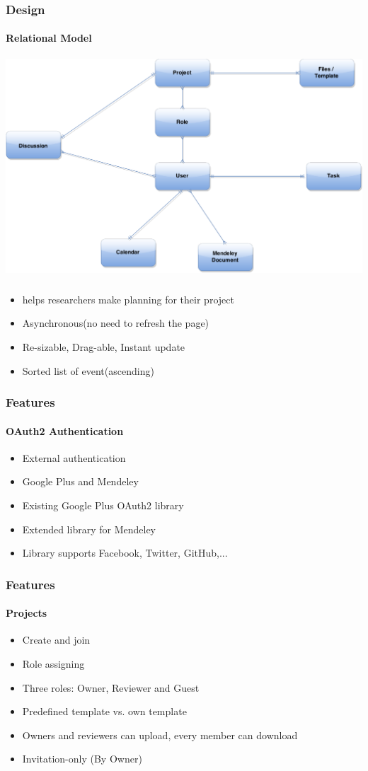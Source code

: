 \documentclass{beamer}
\begin{document}
\begin{frame}
\frametitle{Design}\framesubtitle{Relational Model}
\centering
\includegraphics[scale=0.2]{./images/RMA.png}
\end{frame}

\begin{frame}
\frametitle{}\framesubtitle{}
	\begin{itemize}
		\item helps researchers make planning for their project 
		\item Asynchronous(no need to refresh the page)
		\item Re-sizable, Drag-able, Instant update
		\item Sorted list of event(ascending) 
	\end{itemize}
\end{frame}


\begin{frame}
\frametitle{Features}
\framesubtitle{OAuth2 Authentication}
	\begin{itemize}
		\item External authentication
		\item Google Plus and Mendeley
		\item Existing Google Plus OAuth2 library
		\item Extended library for Mendeley
		\item Library supports Facebook, Twitter, GitHub,...
	\end{itemize}
\end{frame}

\begin{frame}
\frametitle{Features}
\framesubtitle{Projects}
	\begin{itemize}
		\item Create and join
		\item Role assigning
		\item Three roles: Owner, Reviewer and Guest
		\item Predefined template vs. own template
		\item Owners and reviewers can upload, every member can download
		\item Invitation-only (By Owner)
	\end{itemize}
\end{frame}
\end{document}
